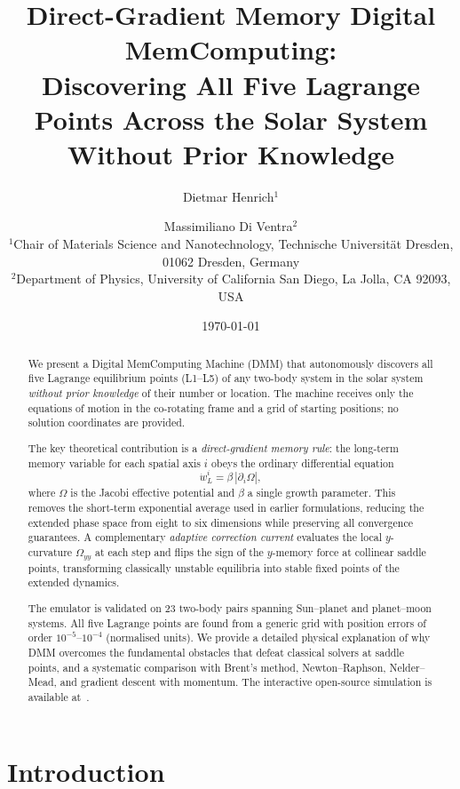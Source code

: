 \documentclass[10pt,twocolumn]{article}
\title{\textbf{Direct-Gradient Memory Digital MemComputing:\\
Discovering All Five Lagrange Points Across the Solar System\\
Without Prior Knowledge}}
\author{
  Dietmar Henrich$^{1}$ \and Massimiliano Di Ventra$^{2}$\\[4pt]
  \small $^{1}$Chair of Materials Science and Nanotechnology,
  Technische Universit\"{a}t Dresden, 01062 Dresden, Germany\\
  \small $^{2}$Department of Physics, University of California San Diego,
  La Jolla, CA 92093, USA
}
\date{\today}
\begin{document}
\maketitle

\begin{abstract}
We present a Digital MemComputing Machine (DMM) that autonomously discovers
all five Lagrange equilibrium points (L1--L5) of any two-body system in the
solar system \emph{without prior knowledge} of their number or location.
The machine receives only the equations of motion in the co-rotating frame and
a grid of starting positions; no solution coordinates are provided.

The key theoretical contribution is a \emph{direct-gradient memory rule}: the
long-term memory variable for each spatial axis $i$ obeys the ordinary
differential equation
\begin{equation*}
  \dot{w}_L^i = \beta\,|\partial_i\Omega|,
\end{equation*}
where $\Omega$ is the Jacobi effective potential and $\beta$ a single growth
parameter.
This removes the short-term exponential average used in earlier formulations,
reducing the extended phase space from eight to six dimensions while preserving
all convergence guarantees.
A complementary \emph{adaptive correction current} evaluates the local
$y$-curvature $\Omega_{yy}$ at each step and flips the sign of the $y$-memory
force at collinear saddle points, transforming classically unstable equilibria
into stable fixed points of the extended dynamics.

The emulator is validated on 23 two-body pairs spanning Sun--planet and
planet--moon systems.
All five Lagrange points are found from a generic grid with position errors of
order $10^{-5}$--$10^{-4}$ (normalised units).
We provide a detailed physical explanation of why DMM overcomes the fundamental
obstacles that defeat classical solvers at saddle points, and a systematic
comparison with Brent's method, Newton--Raphson, Nelder--Mead, and gradient
descent with momentum.
The interactive open-source simulation is available at~\cite{github2026}.
\end{abstract}

\section{Introduction}
\end{document}
